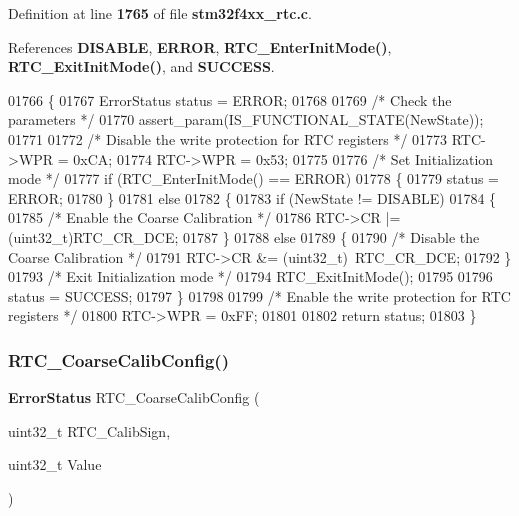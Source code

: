 Definition at line \textbf{ 1765} of file \textbf{ stm32f4xx\+\_\+rtc.\+c}.



References \textbf{ D\+I\+S\+A\+B\+LE}, \textbf{ E\+R\+R\+OR}, \textbf{ R\+T\+C\+\_\+\+Enter\+Init\+Mode()}, \textbf{ R\+T\+C\+\_\+\+Exit\+Init\+Mode()}, and \textbf{ S\+U\+C\+C\+E\+SS}.


\begin{DoxyCode}
01766 \{
01767   ErrorStatus status = ERROR;
01768   
01769   \textcolor{comment}{/* Check the parameters */}
01770   assert_param(IS_FUNCTIONAL_STATE(NewState));
01771 
01772   \textcolor{comment}{/* Disable the write protection for RTC registers */}
01773   RTC->WPR = 0xCA;
01774   RTC->WPR = 0x53;
01775   
01776   \textcolor{comment}{/* Set Initialization mode */}
01777   \textcolor{keywordflow}{if} (RTC_EnterInitMode() == ERROR)
01778   \{
01779     status =  ERROR;
01780   \}
01781   \textcolor{keywordflow}{else}
01782   \{
01783     \textcolor{keywordflow}{if} (NewState != DISABLE)
01784     \{
01785       \textcolor{comment}{/* Enable the Coarse Calibration */}
01786       RTC->CR |= (uint32\_t)RTC_CR_DCE;
01787     \}
01788     \textcolor{keywordflow}{else}
01789     \{ 
01790       \textcolor{comment}{/* Disable the Coarse Calibration */}
01791       RTC->CR &= (uint32\_t)~RTC_CR_DCE;
01792     \}
01793     \textcolor{comment}{/* Exit Initialization mode */}
01794     RTC_ExitInitMode();
01795     
01796     status = SUCCESS;
01797   \} 
01798   
01799   \textcolor{comment}{/* Enable the write protection for RTC registers */}
01800   RTC->WPR = 0xFF; 
01801   
01802   \textcolor{keywordflow}{return} status;
01803 \}
\end{DoxyCode}
\mbox{\label{group__RTC__Group7_gaa3bb10170a2c70ac9ce3e41c611bdd43}} 
\subsubsection{R\+T\+C\+\_\+\+Coarse\+Calib\+Config()}
{\footnotesize\ttfamily \textbf{ Error\+Status} R\+T\+C\+\_\+\+Coarse\+Calib\+Config (\begin{DoxyParamCaption}\item[{uint32\+\_\+t}]{R\+T\+C\+\_\+\+Calib\+Sign,  }\item[{uint32\+\_\+t}]{Value }\end{DoxyParamCaption})}



